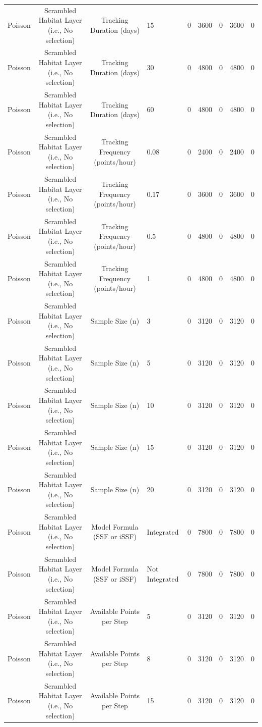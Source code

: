 \documentclass[10pt,a4paper]{article}
\begin{document}
\begin{table}
{\begin{tabular}[t]{lcclcclcc}
Poisson & Scrambled Habitat Layer (i.e., No selection) & Tracking Duration (days) & 15 & 0 & 3600 & 0 & 3600 & 0\\
Poisson & Scrambled Habitat Layer (i.e., No selection) & Tracking Duration (days) & 30 & 0 & 4800 & 0 & 4800 & 0\\
Poisson & Scrambled Habitat Layer (i.e., No selection) & Tracking Duration (days) & 60 & 0 & 4800 & 0 & 4800 & 0\\
Poisson & Scrambled Habitat Layer (i.e., No selection) & Tracking Frequency (points/hour) & 0.08 & 0 & 2400 & 0 & 2400 & 0\\
Poisson & Scrambled Habitat Layer (i.e., No selection) & Tracking Frequency (points/hour) & 0.17 & 0 & 3600 & 0 & 3600 & 0\\
Poisson & Scrambled Habitat Layer (i.e., No selection) & Tracking Frequency (points/hour) & 0.5 & 0 & 4800 & 0 & 4800 & 0\\
Poisson & Scrambled Habitat Layer (i.e., No selection) & Tracking Frequency (points/hour) & 1 & 0 & 4800 & 0 & 4800 & 0\\
Poisson & Scrambled Habitat Layer (i.e., No selection) & Sample Size (n) & 3 & 0 & 3120 & 0 & 3120 & 0\\
Poisson & Scrambled Habitat Layer (i.e., No selection) & Sample Size (n) & 5 & 0 & 3120 & 0 & 3120 & 0\\
Poisson & Scrambled Habitat Layer (i.e., No selection) & Sample Size (n) & 10 & 0 & 3120 & 0 & 3120 & 0\\
Poisson & Scrambled Habitat Layer (i.e., No selection) & Sample Size (n) & 15 & 0 & 3120 & 0 & 3120 & 0\\
Poisson & Scrambled Habitat Layer (i.e., No selection) & Sample Size (n) & 20 & 0 & 3120 & 0 & 3120 & 0\\
Poisson & Scrambled Habitat Layer (i.e., No selection) & Model Formula (SSF or iSSF) & Integrated & 0 & 7800 & 0 & 7800 & 0\\
Poisson & Scrambled Habitat Layer (i.e., No selection) & Model Formula (SSF or iSSF) & Not Integrated & 0 & 7800 & 0 & 7800 & 0\\
Poisson & Scrambled Habitat Layer (i.e., No selection) & Available Points per Step & 5 & 0 & 3120 & 0 & 3120 & 0\\
Poisson & Scrambled Habitat Layer (i.e., No selection) & Available Points per Step & 8 & 0 & 3120 & 0 & 3120 & 0\\
Poisson & Scrambled Habitat Layer (i.e., No selection) & Available Points per Step & 15 & 0 & 3120 & 0 & 3120 & 0\\

\end{tabular}}
\end{table}
\end{document}

